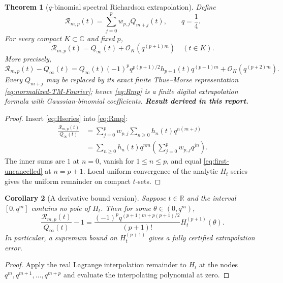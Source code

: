 \documentclass[11pt,oneside]{article}
\numberwithin{equation}{section}
\newtheorem{theorem}{Theorem}[section]
\newtheorem{corollary}[theorem]{Corollary}
\theoremstyle{definition}
\theoremstyle{remark}
\newcommand{\R}{\mathbb R}
\newcommand{\C}{\mathbb C}
\newcommand{\bigO}{\mathcal O}
\newcommand{\newresult}{\textbf{Result derived in this report.}}
\begin{document}
\begin{theorem}[$q$-binomial spectral Richardson extrapolation]
\label{thm:qRichardson}
Define
\begin{equation}
 \mathcal R_{m,p}(t)=\sum_{j=0}^{p}w_{p,j}Q_{m+j}(t),
 \qquad q=\frac14.
 \label{eq:Rmp}
\end{equation}
For every compact $K\subset\C$ and fixed $p$,
\begin{equation}
 \boxed{
 \mathcal R_{m,p}(t)=Q_\infty(t)+\bigO_K(q^{(p+1)m})
 \quad(t\in K).}
 \label{eq:Richardson-order}
\end{equation}
More precisely,
\begin{equation}
 \mathcal R_{m,p}(t)-Q_\infty(t)
 =Q_\infty(t)(-1)^pq^{p(p+1)/2}h_{p+1}(t)q^{(p+1)m}
 +\bigO_K(q^{(p+2)m}).
 \label{eq:Richardson-leading}
\end{equation}
Every $Q_{m+j}$ may be replaced by its exact finite Thue--Morse representation
\eqref{eq:normalized-TM-Fourier}; hence \eqref{eq:Rmp} is a finite digital extrapolation
formula with Gaussian-binomial coefficients.
\newresult
\end{theorem}

\begin{proof}
Insert \eqref{eq:Hseries} into \eqref{eq:Rmp}:
\begin{align*}
 \frac{\mathcal R_{m,p}(t)}{Q_\infty(t)}
 &=\sum_{j=0}^{p}w_{p,j}\sum_{n\ge0}h_n(t)q^{n(m+j)}\\
 &=\sum_{n\ge0}h_n(t)q^{nm}
   \left(\sum_{j=0}^{p}w_{p,j}q^{jn}\right).
\end{align*}
The inner sums are $1$ at $n=0$, vanish for $1\le n\le p$, and equal
\eqref{eq:first-uncancelled} at $n=p+1$.  Local uniform convergence of the analytic $H_t$
series gives the uniform remainder on compact $t$-sets.
\end{proof}

\begin{corollary}[A derivative bound version]
\label{cor:Richardson-bound}
Suppose $t\in\R$ and the interval $[0,q^m]$ contains no pole of $H_t$.  Then for some
$\theta\in(0,q^m)$,
\begin{equation}
 \frac{\mathcal R_{m,p}(t)}{Q_\infty(t)}-1
 =\frac{(-1)^pq^{(p+1)m+p(p+1)/2}}{(p+1)!}
 H_t^{(p+1)}(\theta).
 \label{eq:Richardson-remainder}
\end{equation}
In particular, a supremum bound on $H_t^{(p+1)}$ gives a fully certified extrapolation error.
\end{corollary}

\begin{proof}
Apply the real Lagrange interpolation remainder to $H_t$ at the nodes
$q^m,q^{m+1},\ldots,q^{m+p}$ and evaluate the interpolating polynomial at zero.
\end{proof}
\end{document}
